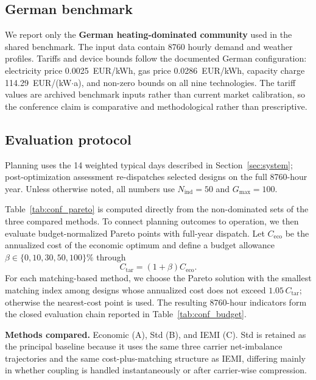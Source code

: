 \subsection{German benchmark}

We report only the \textbf{German heating-dominated community} used in the shared benchmark. The input data contain 8760 hourly demand and weather profiles. Tariffs and device bounds follow the documented German configuration: electricity price 0.0025~EUR/kWh, gas price 0.0286~EUR/kWh, capacity charge 114.29~EUR/(kW$\cdot$a), and non-zero bounds on all nine technologies. The tariff values are archived benchmark inputs rather than current market calibration, so the conference claim is comparative and methodological rather than prescriptive.

\subsection{Evaluation protocol}

Planning uses the 14 weighted typical days described in Section~\ref{sec:system}; post-optimization assessment re-dispatches selected designs on the full 8760-hour year. Unless otherwise noted, all numbers use $N_{\text{ind}}=50$ and $G_{\text{max}}=100$.

Table~\ref{tab:conf_pareto} is computed directly from the non-dominated sets of the three compared methods. To connect planning outcomes to operation, we then evaluate budget-normalized Pareto points with full-year dispatch. Let $C_{\text{eco}}$ be the annualized cost of the economic optimum and define a budget allowance $\beta \in \{0,10,30,50,100\}\%$ through
\begin{equation}
    C_{\text{tar}} = (1 + \beta) C_{\text{eco}}.
\end{equation}
For each matching-based method, we choose the Pareto solution with the smallest matching index among designs whose annualized cost does not exceed $1.05\,C_{\text{tar}}$; otherwise the nearest-cost point is used. The resulting 8760-hour indicators form the closed evaluation chain reported in Table~\ref{tab:conf_budget}.

\textbf{Methods compared.} Economic (A), Std (B), and IEMI (C). Std is retained as the principal baseline because it uses the same three carrier net-imbalance trajectories and the same cost-plus-matching structure as IEMI, differing mainly in whether coupling is handled instantaneously or after carrier-wise compression.
